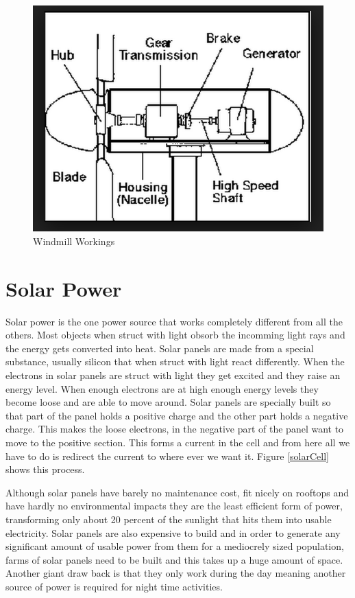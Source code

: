 \documentclass[msc,oneside]{ubcthesis}%
\begin{document}
\begin{figure}[hbt]\label{windmillWorkings}
  \begin{center}
    \includegraphics[width=1\textwidth]{windmill}
    \caption[Windmill Workings]{Windmill Workings }
  \end{center}
\end{figure}

\newpage

\section{Solar Power}
Solar power is the one power source that works completely different from all the others. Most objects when 
struct with light obsorb the incomming light rays and the energy gets converted into heat. Solar panels are made from a special substance, 
usually silicon that when struct with light react differently. When the electrons in solar panels are 
struct with light they get excited and they raise an energy level. When enough electrons are at high enough 
energy levels they become loose and are able to move around. Solar panels are specially built so that part of the panel holds a positive charge and the other part holds a negative charge. This makes the loose electrons, in the negative part of the panel want to move to the positive section. This forms a current in the cell and from here all we have to do is redirect the current to where ever we want it. Figure 
\ref{solarCell} shows this process. 

Although solar panels have barely no maintenance cost, fit nicely on rooftops and have hardly no 
environmental impacts they are the least efficient form of power, transforming  only about 20 percent of 
the sunlight that hits them into usable electricity. Solar panels are also expensive to build and in order 
to generate any significant amount of usable power from them for a mediocrely sized population, farms of 
solar panels need to be built and this takes up a huge amount of space.  Another giant draw back is that 
they only work during the day meaning another source of power is required for night time activities. 
\bigskip
\end{document}
